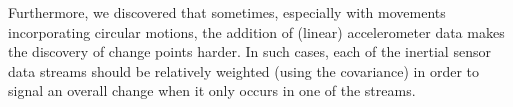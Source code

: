 Furthermore, we discovered that sometimes, especially with movements incorporating circular motions, the addition of (linear) accelerometer data makes the discovery of change points harder.
In such cases, each of the inertial sensor data streams should be relatively weighted (\eg using the covariance) in order to signal an overall change when it only occurs in one of the streams.